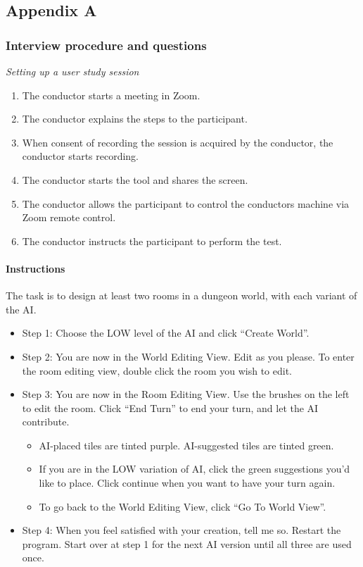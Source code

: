 \appendix
\subsection{Appendix A}
\subsubsection{Interview procedure and questions}

\emph{Setting up a user study session}


\begin{enumerate}
     \item The conductor starts a meeting in Zoom.
     \item The conductor explains the steps to the participant.
     \item When consent of recording the session is acquired by the conductor, the conductor starts recording.
     \item The conductor starts the tool and shares the screen.
     \item The conductor allows the participant to control the conductors machine via Zoom remote control.
     \item The conductor instructs the participant to perform the test.
 \end{enumerate}

\paragraph{Instructions}

The task is to design at least two rooms in a dungeon world, with each variant of the AI.

\begin{itemize}
    \item Step 1: Choose the LOW level of the AI and click “Create World”.

\item Step 2: You are now in the World Editing View. Edit as you please. To enter the room editing view, double click the room you wish to edit.

\item Step 3: You are now in the Room Editing View. Use the brushes on the left to edit the room. Click “End Turn” to end your turn, and let the AI contribute. 

\begin{itemize}
    \item AI-placed tiles are tinted purple. AI-suggested tiles are tinted green.
    \item If you are in the LOW variation of AI, click the green suggestions you’d like to place. Click continue when you want to have your turn again.
    \item To go back to the World Editing View, click “Go To World View”.
\end{itemize}

\item Step 4: When you feel satisfied with your creation, tell me so. Restart the program. Start over at step 1 for the next AI version until all three are used once.

\end{itemize}


